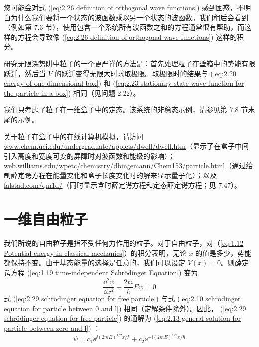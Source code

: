 	您可能会对式 (\ref{eq:2.26 definition of orthogonal wave functions}) 感到困惑，不明白为什么我们要将一个状态的波函数乘以另一个状态的波函数。我们稍后会看到（例如第 7.3 节），使用包含一个系统所有波函数之和的方程通常很有帮助，而这样的方程会导致像 (\ref{eq:2.26 definition of orthogonal wave functions}) 这样的积分。

	研究无限深势阱中粒子的一个更严谨的方法是：首先处理粒子在壁箱中的势能有限跃迁，然后当 $V$ 的跃迁变得无限大时求取极限。取极限时的结果与 (\ref{eq:2.20 energy of one-dimensional box}) 和 (\ref{eq:2.23 stationary state wave function for the particle in a box}) 相同（见问题 2.22）。

	我们只考虑了粒子在一维盒子中的定态。该系统的非稳态示例，请参见第 7.8 节末尾的示例。

	关于粒子在盒子中的在线计算机模拟，请访问 \url{www.chem.uci.edu/undergraduate/applets/dwell/dwell.htm}（显示了在盒子中间引入高度和宽度可变的屏障时对波函数和能级的影响）；\url{web.williams.edu/wpetc/chemistry/dbingemann/Chem153/particle.html}（通过绘制薛定谔方程在能量变化和盒子长度变化时的解来显示量子化）；以及 \url{falstad.com/qm1d/}（同时显示含时薛定谔方程和定态薛定谔方程；见 7.47）。

\section{一维自由粒子}
\label{sec:2.3 The Free Particle in One Dimension}
	我们所说的自由粒子是指不受任何力作用的粒子。对于自由粒子，对（\ref{eq:1.12 Potential energy in classical mechanics}）的积分表明，无论 $x$ 的值是多少，势能都保持不变。由于基态能量的选择是任意的，我们可以设定 $V(x) = 0$。则薛定谔方程 (\ref{eq:1.19 time-independent Schrödinger Equation}) 变为
	\begin{equation}
		\frac{\dd ^2\psi}{\dd x^2}+\frac{2m}{\hbar}E\psi = 0
		\label{eq:2.29 schrödinger equation for free particle}
	\end{equation}
	式 (\ref{eq:2.29 schrödinger equation for free particle}) 与式 (\ref{eq:2.10 schrödinger equation for particle between 0 and l}) 相同（定解条件除外）。因此， (\ref{eq:2.29 schrödinger equation for free particle}) 的通解为 (\ref{eq:2.13 general solution for particle between zero and l}) ：
	\begin{equation}
		\psi = c_1\ee^{\ii \left(2mE\right)^{1/2} x /\hbar}+c_2\ee^{-\ii \left(2mE\right)^{1/2} x /\hbar}
		\label{eq:2.30}
	\end{equation}

